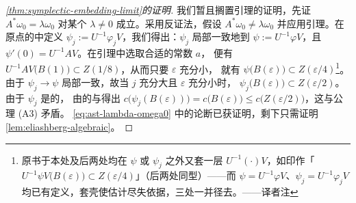 \begin{proof}[\cref*{thm:symplectic-embedding-limit}的证明]
我们暂且搁置引理的证明，先证 $A^{*}\omega_0=\lambda\omega_0$%
对某个 $\lambda\neq0$ 成立。采用反证法，假设 $A^{*}\omega_0\neq\lambda\omega_0$%
并应用引理。在原点的\trNeighborhood{}中定义\trSymplecticMapping{}%
$\psi_j:=U^{-1}\varphi_jV$，我们得出：$\psi_j$ 局部一致地\trConverge{}到%
$\psi:=U^{-1}\varphi V$，且 $\psi'(0)=U^{-1}AV$。在引理中选取合适的常数 $a$，%
便有 $U^{-1}AV\bigl(B(1)\bigr)\subset Z(1/8)$，从而只要 $\varepsilon$ 充分小，%
就有 $\psi\bigl(B(\varepsilon)\bigr)\subset Z(\varepsilon/4)$\footnote{原书于本处及后两处均在 $\psi$ 或 $\psi_j$ 之外又套一层 $U^{-1}(\cdot)V$，如印作「$U^{-1}\psi V\bigl(B(\varepsilon)\bigr)\subset Z(\varepsilon/4)$」（后两处同型）——而 $\psi=U^{-1}\varphi V$、$\psi_j=U^{-1}\varphi_jV$ 均已有定义，套壳使估计尽失依据，三处一并径去。——译者注}。%
由于 $\psi_j\to\psi$ 局部一致，故当 $j$ 充分大且 $\varepsilon$ 充分小时，%
$\psi_j\bigl(B(\varepsilon)\bigr)\subset Z(\varepsilon/2)$。%
由于 $\psi_j$ 是\trSymplectic{}的，%
由\trCapacity{}的\trInvariance{}与\trMonotonicity{}得出%
$c\bigl(\psi_j(B(\varepsilon))\bigr)=c\bigl(B(\varepsilon)\bigr)
\le c\bigl(Z(\varepsilon/2)\bigr)$，这与\trNontriviality{}公理 (A3) 矛盾。%
\eqref{eq:ast-lambda-omega0} 中的论断已获证明，剩下只需证明%
\cref{lem:eliashberg-algebraic}。


\end{proof}
